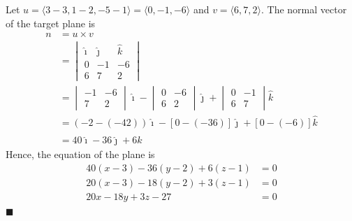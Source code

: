 \begin{enumerate}
          Let $u = \langle 3 - 3, 1 - 2, -5 - 1 \rangle = \langle 0, -1, -6 \rangle$ and
          $v = \langle 6, 7, 2 \rangle$. The normal vector of the target plane is
          \begin{align*}
              n & = u \times v                                                                   \\
                & = \begin{vmatrix}
                        \hat{\imath} & \hat{\jmath} & \hat{k} \\
                        0            & -1           & -6      \\
                        6            & 7            & 2
                    \end{vmatrix}                    \\
                & = \begin{vmatrix}
                        -1 & -6 \\
                        7  & 2
                    \end{vmatrix}\hat{\imath} - \begin{vmatrix}
                                                    0 & -6 \\
                                                    6 & 2
                                                \end{vmatrix}\hat{\jmath} + \begin{vmatrix}
                                                                                0 & -1 \\
                                                                                6 & 7
                                                                            \end{vmatrix}\hat{k} \\
                & = (-2 - (-42))\hat{\imath} - [0 - (-36)]\hat{\jmath} + [0 - (-6)]\hat{k}       \\
                & = 40\hat{\imath} - 36\hat{\jmath} + 6\hat{k}
          \end{align*}
          Hence, the equation of the plane is
          \begin{align*}
              40(x - 3) - 36(y - 2) + 6(z - 1) & = 0 \\
              20(x - 3) - 18(y - 2) + 3(z - 1) & = 0 \\
              20x - 18y + 3z - 27              & = 0
          \end{align*} \hfill $\blacksquare$

\end{enumerate}
